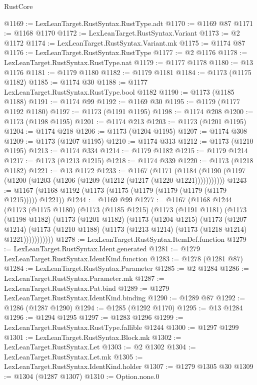 \begin{lexlean}{RustCore}
\begin{coremodule}
@1169 := LexLeanTarget.RustSyntax.RustType.adt
@1170 := @1169 @87
@1171 := @1168 @1170
@1172 := LexLeanTarget.RustSyntax.Variant
@1173 := @2 @1172
@1174 := LexLeanTarget.RustSyntax.Variant.mk
@1175 := @1174 @87
@1176 := LexLeanTarget.RustSyntax.RustType
@1177 := @2 @1176
@1178 := LexLeanTarget.RustSyntax.RustType.nat
@1179 := @1177 @1178
@1180 := @13 @1176
@1181 := @1179 @1180
@1182 := @1179 @1181
@1184 := @1173 (@1175 @1182)
@1185 := @1174 @30
@1188 := @1177 LexLeanTarget.RustSyntax.RustType.bool @1182
@1190 := @1173 (@1185 @1188)
@1191 := @1174 @99
@1192 := @1169 @30
@1195 := @1179 (@1177 @1192 @1180)
@1197 := @1173 (@1191 @1195)
@1198 := @1174 @208
@1200 := @1173 (@1198 @1195)
@1201 := @1174 @213
@1203 := @1173 (@1201 @1195)
@1204 := @1174 @218
@1206 := @1173 (@1204 @1195)
@1207 := @1174 @308
@1209 := @1173 (@1207 @1195)
@1210 := @1174 @313
@1212 := @1173 (@1210 @1195)
@1213 := @1174 @334
@1214 := @1179 @1182
@1215 := @1179 @1214
@1217 := @1173 (@1213 @1215)
@1218 := @1174 @339
@1220 := @1173 (@1218 @1182)
@1221 := @13 @1172
@1233 := @1167
    (@1171 (@1184 (@1190 (@1197 (@1200 (@1203 (@1206 (@1209 (@1212 (@1217 (@1220 @1221)))))))))))
@1243 := @1167 (@1168 @1192 (@1173 (@1175 (@1179 (@1179 (@1179 (@1179 @1215))))) @1221))
@1244 := @1169 @99
@1277 := @1167
    (@1168
      @1244
      (@1173
        (@1175 @1180)
        (@1173
          (@1185 @1215)
          (@1173
            (@1191 @1181)
            (@1173
              (@1198 @1182)
              (@1173
                (@1201 @1182)
                (@1173
                  (@1204 @1215)
                  (@1173
                    (@1207 @1214)
                    (@1173 (@1210 @1188) (@1173 (@1213 @1214) (@1173 (@1218 @1214) @1221)))))))))))
@1278 := LexLeanTarget.RustSyntax.ItemDef.function
@1279 := LexLeanTarget.RustSyntax.Ident.generated
@1281 := @1279 LexLeanTarget.RustSyntax.IdentKind.function
@1283 := @1278 (@1281 @87)
@1284 := LexLeanTarget.RustSyntax.Parameter
@1285 := @2 @1284
@1286 := LexLeanTarget.RustSyntax.Parameter.mk
@1287 := LexLeanTarget.RustSyntax.Pat.bind
@1289 := @1279 LexLeanTarget.RustSyntax.IdentKind.binding
@1290 := @1289 @87
@1292 := @1286 (@1287 @1290)
@1294 := @1285 (@1292 @1170)
@1295 := @13 @1284
@1296 := @1294 @1295
@1297 := @1283 @1296
@1299 := LexLeanTarget.RustSyntax.RustType.fallible @1244
@1300 := @1297 @1299
@1301 := LexLeanTarget.RustSyntax.Block.mk
@1302 := LexLeanTarget.RustSyntax.Let
@1303 := @2 @1302
@1304 := LexLeanTarget.RustSyntax.Let.mk
@1305 := LexLeanTarget.RustSyntax.IdentKind.holder
@1307 := @1279 @1305 @30
@1309 := @1304 (@1287 @1307)
@1310 := Option.none.{0}

\end{coremodule}
\end{lexlean}
